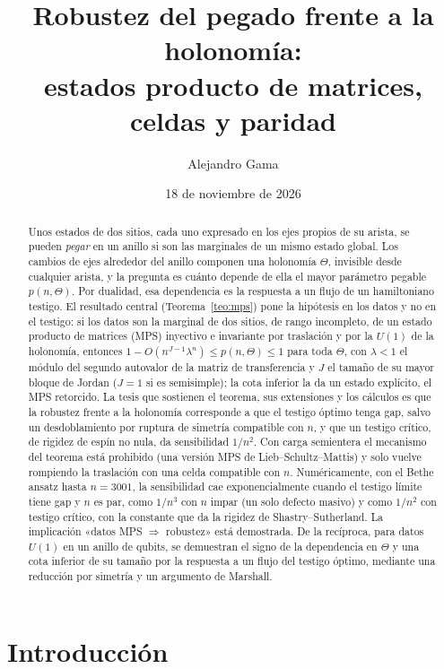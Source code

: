 \documentclass[11pt,a4paper]{article}
\title{Robustez del pegado frente a la holonomía:\\ estados producto de matrices, celdas y paridad}
\author{Alejandro Gama}
\date{18 de noviembre de 2026}
\theoremstyle{remark}
\begin{document}
\maketitle

\begin{abstract}
Unos estados de dos sitios, cada uno expresado en los ejes propios de su arista, se pueden
\emph{pegar} en un anillo si son las marginales de un mismo estado global. Los cambios de ejes
alrededor del anillo componen una holonomía $\Theta$, invisible desde cualquier arista, y la pregunta
es cuánto depende de ella el mayor parámetro pegable $p(n,\Theta)$. Por dualidad, esa dependencia es
la respuesta a un flujo de un hamiltoniano testigo. El resultado central (Teorema~\ref{teo:mps}) pone
la hipótesis en los datos y no en el testigo: si los datos son la marginal de dos sitios, de rango
incompleto, de un estado producto de matrices (MPS) inyectivo e invariante por traslación y por la
$U(1)$ de la holonomía, entonces $1-O(n^{J-1}\lambda^{n})\le p(n,\Theta)\le1$ para toda $\Theta$, con
$\lambda<1$ el módulo del segundo autovalor de la matriz de transferencia y $J$ el tamaño de su
mayor bloque de Jordan ($J=1$ si es semisimple); la cota inferior la da un
estado explícito, el MPS retorcido. La tesis que sostienen el teorema, sus extensiones y los cálculos
es que la robustez frente a la holonomía corresponde a que el testigo óptimo tenga gap, salvo un
desdoblamiento por ruptura de simetría compatible con $n$, y que un testigo crítico, de rigidez de
espín no nula, da sensibilidad $1/n^2$. Con carga semientera el mecanismo del teorema está prohibido (una versión MPS de
Lieb--Schultz--Mattis) y solo vuelve rompiendo la traslación con una celda compatible con $n$.
Numéricamente, con el Bethe ansatz hasta $n=3001$, la sensibilidad cae exponencialmente cuando el
testigo límite tiene gap y $n$ es par, como $1/n^3$ con $n$ impar (un solo defecto masivo) y como
$1/n^2$ con testigo crítico, con la constante que da la rigidez de Shastry--Sutherland. La implicación «datos MPS $\Rightarrow$
robustez» está demostrada. De la recíproca, para datos $U(1)$ en un anillo de qubits, se demuestran
el signo de la dependencia en $\Theta$ y una cota inferior de su tamaño por la respuesta a un flujo del
testigo óptimo, mediante una reducción por simetría y un argumento de Marshall.
\end{abstract}

\section{Introducción}
\end{document}
